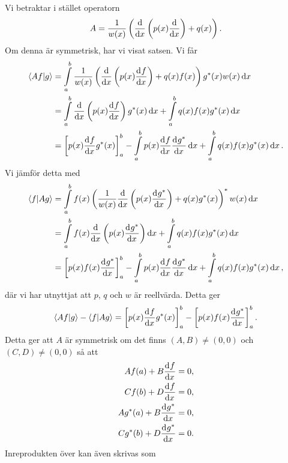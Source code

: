 \proof
Vi betraktar i stället operatorn
\begin{align*}
	A = \frac{1}{w(x)}\left(\dv{x}\left(p(x)\dv{x}\right) + q(x)\right).
\end{align*}
Om denna är symmetrisk, har vi visat satsen. Vi får
\begin{align*}
	\bra{Af}\ket{g} &= \int\limits_{a}^{b}\frac{1}{w(x)}\left(\dv{x}\left(p(x)\dv[]{f}{x} (x)\right) + q(x)f(x)\right)g^{*}(x)w(x)\dd{x} \\
	               &= \int\limits_{a}^{b}\dv{x}\left(p(x)\dv[]{f}{x} (x)\right)g^{*}(x)\dd{x} + \int\limits_{a}^{b}q(x)f(x)g^{*}(x)\dd{x} \\
	               &= \left[p(x)\dv[]{f}{x} (x)g^{*}(x)\right]_{a}^{b} - \int\limits_{a}^{b}p(x)\dv[]{f}{x} (x)\dv[]{g^{*}}{x} (x)\dd{x} + \int\limits_{a}^{b}q(x)f(x)g^{*}(x)\dd{x}.
\end{align*}
Vi jämför detta med
\begin{align*}
	\bra{f}\ket{Ag}&= \int\limits_{a}^{b}f(x)\left(\frac{1}{w(x)}\dv{x}\left(p(x)\dv[]{g^{*}}{x} (x)\right) + q(x)g^{*}(x)\right)^{*}w(x)\dd{x} \\
	               &= \int\limits_{a}^{b}f(x)\dv{x}\left(p(x)\dv[]{g^{*}}{x} (x)\right)\dd{x} + \int\limits_{a}^{b}q(x)f(x)g^{*}(x)\dd{x} \\
	               &= \left[p(x)f(x)\dv[]{g^{*}}{x} (x)\right]_{a}^{b} - \int\limits_{a}^{b}p(x)\dv[]{f}{x} (x)\dv[]{g^{*}}{x} (x)\dd{x} + \int\limits_{a}^{b}q(x)f(x)g^{*}(x)\dd{x},
\end{align*}
där vi har utnyttjat att $p$, $q$ och $w$ är reellvärda. Detta ger
\begin{align*}
	\bra{Af}\ket{g} - \bra{f}\ket{Ag} = \left[p(x)\dv[]{f}{x} (x)g^{*}(x)\right]_{a}^{b} - \left[p(x)f(x)\dv[]{g^{*}}{x} (x)\right]_{a}^{b}.
\end{align*}
Detta ger att $A$ är symmetrisk om det finns $(A, B) \neq (0, 0)$ och $(C, D) \neq (0, 0)$ så att
\begin{align*}
	Af(a) + B\dv[]{f}{x} (a) = 0, \\
	Cf(b) + D\dv[]{f}{x} (b) = 0, \\
	Ag^{*}(a) + B\dv[]{g^{*}}{x} (a) = 0, \\
	Cg^{*}(b) + D\dv[]{g^{*}}{x} (b) = 0.
\end{align*}
Inreprodukten över kan även skrivas som
